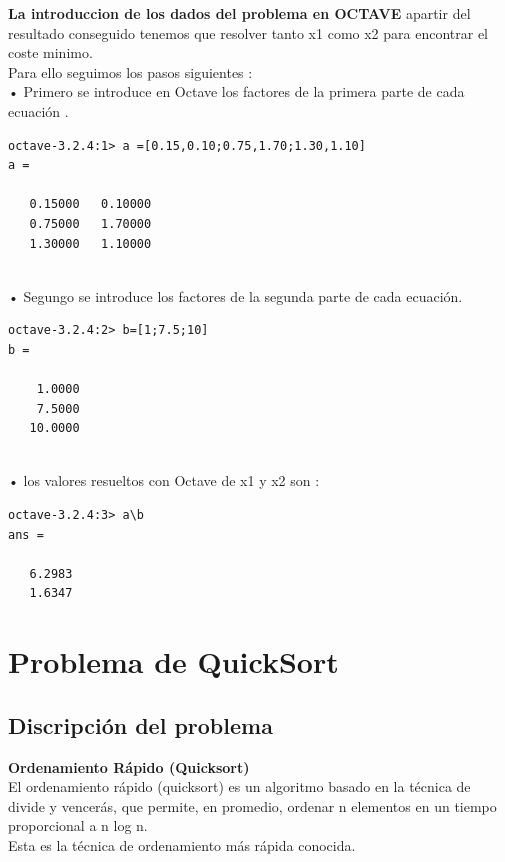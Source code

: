 \documentclass[a4,12pt]{article}
\begin{document}
\textbf {La introduccion de los dados del problema en OCTAVE} apartir del resultado conseguido  tenemos que resolver tanto x1 como x2 para encontrar el coste minimo.\\
Para ello seguimos los pasos siguientes : \\

• Primero se introduce en Octave los factores de la primera parte de cada ecuación .\\
\begin{verbatim}
octave-3.2.4:1> a =[0.15,0.10;0.75,1.70;1.30,1.10]
a =

   0.15000   0.10000
   0.75000   1.70000
   1.30000   1.10000
   
\end{verbatim}

• Segungo se introduce los factores de la segunda parte de cada ecuación.\\
\begin{verbatim}
octave-3.2.4:2> b=[1;7.5;10]
b =

    1.0000
    7.5000
   10.0000
   
\end{verbatim}

• los valores resueltos con Octave de x1 y x2 son :\\
\begin{verbatim}
octave-3.2.4:3> a\b
ans =

   6.2983
   1.6347
\end{verbatim}

\section{Problema de QuickSort}
\subsection{Discripción del problema}
\textbf {Ordenamiento Rápido (Quicksort)}\\
 El ordenamiento rápido (quicksort) es un algoritmo basado en la técnica de divide y vencerás, que permite, en promedio, ordenar n elementos en un tiempo proporcional a n log n.\\
Esta es la técnica de ordenamiento más rápida conocida.\\
\end{document}
